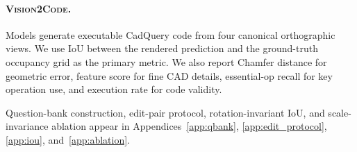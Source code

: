 \paragraph{\textsc{Vision2Code}.} 
Models generate executable CadQuery code from four canonical orthographic views. We use IoU between the rendered prediction and the ground-truth occupancy grid as the primary metric. We also report Chamfer distance for geometric error, feature score for fine CAD details, 
essential-op recall for key operation use, and execution rate for code validity. 

Question-bank construction, edit-pair protocol, rotation-invariant IoU, and scale-invariance ablation appear in Appendices~\ref{app:qbank}, \ref{app:edit_protocol}, \ref{app:iou}, and~\ref{app:ablation}.